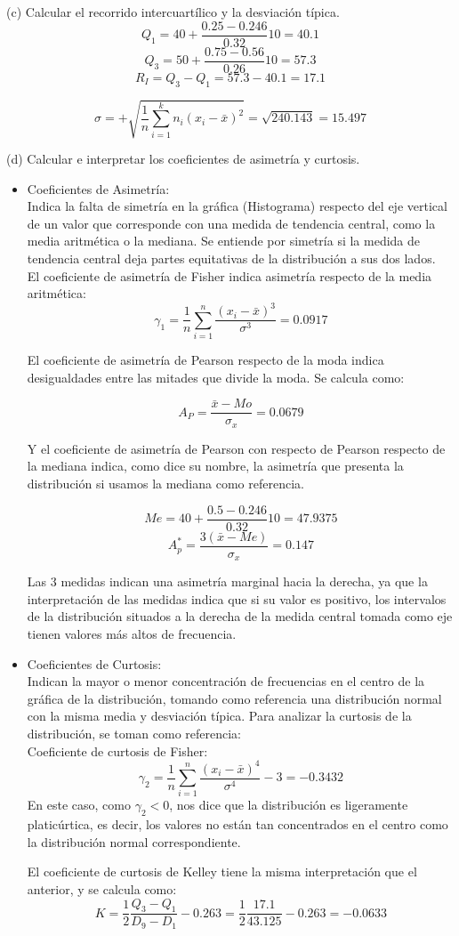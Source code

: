\documentclass[a4paper,12pt]{article}
\begin{document}
(c) Calcular el recorrido intercuartílico y la desviación típica.\\
$$Q_1 = 40 + \frac{0.25-0.246}{0.32} 10 = 40.1$$
$$Q_3 = 50 + \frac{0.75-0.56}{0.26} 10 = 57.3$$
$$R_I = Q_3 - Q_1 = 57.3-40.1 = 17.1$$

$$\sigma = +\sqrt{\frac{1}{n}\sum\limits_{i=1}^kn_i(x_i-\bar x)^2} = \sqrt{240.143} = 15.497$$


(d) Calcular e interpretar los coeficientes de asimetría y curtosis.

\begin{itemize}
    \item Coeficientes de Asimetría:\\
    Indica la falta de simetría en la gráfica (Histograma) respecto del eje vertical de un valor que corresponde con una medida de tendencia central, como la media aritmética o la mediana. Se entiende por simetría si la medida de tendencia central deja partes equitativas de la distribución a sus dos lados.\\
    El coeficiente de asimetría de Fisher indica asimetría respecto de la media aritmética:
    $$\gamma_{1} = \frac{1}{n}\sum_{i=1}^{n}\frac{{(x_{i} - \bar{x})^{3}}} {\sigma^{3}} = 0.0917$$

    El coeficiente de asimetría de Pearson respecto de la moda indica desigualdades entre las mitades que divide la moda. Se calcula como:

    $$A_P = \frac{\bar x - Mo}{\sigma_x} = 0.0679$$

    Y el coeficiente de asimetría de Pearson con respecto de Pearson respecto de la mediana indica, como dice su nombre, la asimetría que presenta la distribución si usamos la mediana como referencia.

    $$Me = 40 + \frac{0.5-0.246}{0.32}10 = 47.9375$$
    $$A_p^*=\frac{3(\bar x -Me)}{\sigma_x} = 0.147$$

    Las 3 medidas indican una asimetría marginal hacia la derecha, ya que la interpretación de las medidas indica que si su valor es positivo, los intervalos de la distribución situados a la derecha de la medida central tomada como eje tienen valores más altos de frecuencia.

    \item Coeficientes de Curtosis:\\
    Indican la mayor o menor concentración de frecuencias en el centro de la gráfica de la distribución, tomando como referencia una distribución normal con la misma media y desviación típica. Para analizar la curtosis de la distribución, se toman como referencia:\\
    Coeficiente de curtosis de Fisher:
    $$\gamma_2 = \frac{1}{n}\sum_{i=1}^{n}\frac{{(x_{i} - \bar{x})^{4}}} {\sigma^{4}} -3 = -0.3432$$
    En este caso, como $\gamma_2<0$, nos dice que la distribución es ligeramente platicúrtica, es decir, los valores no están tan concentrados en el centro como la distribución normal correspondiente.
    
    El coeficiente de curtosis de Kelley tiene la misma interpretación que el anterior, y se calcula como:
    $$K = \frac{1}{2} \frac{Q_3-Q_1}{D_9-D_1} - 0.263 = \frac{1}{2} \frac{17.1}{43.125} -0.263=-0.0633$$

    
\end{itemize}
\end{document}
